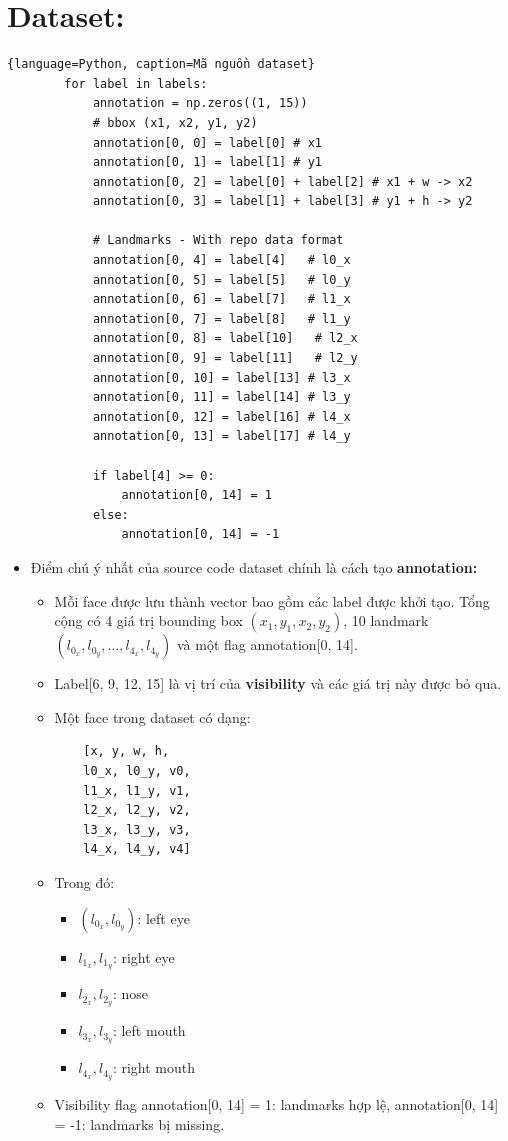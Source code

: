 \documentclass[12pt, a4paper, oneside]{book}
\theoremstyle{plain}
\numberwithin{equation}{chapter} \DeclareMathOperator{\Var}{var}
\begin{document}
\section{Dataset:}
\begin{lstlisting}{language=Python, caption=Mã nguồn dataset}
        for label in labels:
            annotation = np.zeros((1, 15))
            # bbox (x1, x2, y1, y2)
            annotation[0, 0] = label[0] # x1
            annotation[0, 1] = label[1] # y1
            annotation[0, 2] = label[0] + label[2] # x1 + w -> x2
            annotation[0, 3] = label[1] + label[3] # y1 + h -> y2

            # Landmarks - With repo data format
            annotation[0, 4] = label[4]   # l0_x
            annotation[0, 5] = label[5]   # l0_y
            annotation[0, 6] = label[7]   # l1_x
            annotation[0, 7] = label[8]   # l1_y
            annotation[0, 8] = label[10]   # l2_x
            annotation[0, 9] = label[11]   # l2_y
            annotation[0, 10] = label[13] # l3_x
            annotation[0, 11] = label[14] # l3_y
            annotation[0, 12] = label[16] # l4_x
            annotation[0, 13] = label[17] # l4_y

            if label[4] >= 0:
                annotation[0, 14] = 1
            else:
                annotation[0, 14] = -1
\end{lstlisting}
\begin{itemize}
    \item[--] Điểm chú ý nhất của source code dataset chính là cách tạo \textbf{annotation:}
    \begin{itemize}
        \item[+] Mỗi face được lưu thành vector bao gồm các label được khởi tạo. Tổng cộng có 4 giá trị bounding box \((x_1, y_1, x_2, y_2)\), 10 landmark \((l_{0_x}, l_{0_y},\dots, l_{4_x}, l_{4_y})\) và một flag annotation[0, 14].
        \item[+] Label[6, 9, 12, 15] là vị trí của \textbf{visibility} và các giá trị này được bỏ qua.
        \item[+] Một face trong dataset có dạng:
        \begin{lstlisting}
    [x, y, w, h,
    l0_x, l0_y, v0,
    l1_x, l1_y, v1,
    l2_x, l2_y, v2,
    l3_x, l3_y, v3,
    l4_x, l4_y, v4]
        \end{lstlisting}
        \item[+] Trong đó:
        \begin{itemize}
            \item \((l_{0_x}, l_{0_y})\): left eye
            \item \(l_{1_x}, l_{1_y}\): right eye
            \item \(l_{2_x}, l_{2_y}\): nose 
            \item \(l_{3_x}, l_{3_y}\): left mouth
            \item \(l_{4_x}, l_{4_y}\): right mouth
        \end{itemize} 
        \item[+] Visibility flag annotation[0, 14] = 1: landmarks hợp lệ, annotation[0, 14] = -1: landmarks bị missing.
    \end{itemize} 
\end{itemize}
\end{document}
